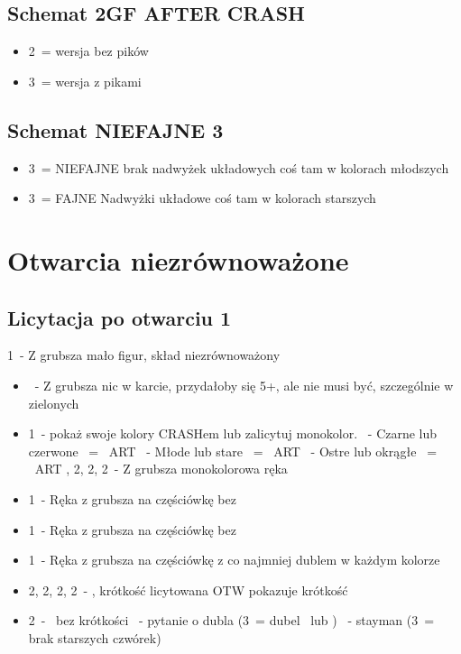 \documentclass[12pt, a4paper]{article}
\begin{document}
\subsection{Schemat 2\spades GF AFTER CRASH}
\begin{itemize}
    \item 2\nt\ = wersja bez pików
    \item 3\clubs\ = wersja z pikami
\end{itemize}

\subsection{Schemat NIEFAJNE 3\diams}
\begin{itemize}
    \item 3\hearts\ = 
    \subitem NIEFAJNE
    \subitem brak nadwyżek układowych
    \subitem coś tam w kolorach młodszych
    \item 3\spades\ =
    \subitem FAJNE
    \subitem Nadwyżki układowe
    \subitem coś tam w kolorach starszych
\end{itemize}


\pagebreak
\section{Otwarcia niezrównoważone}
\subsection{Licytacja po otwarciu 1\clubs}
\begin{formal}
    1\clubs\ - Z grubsza mało figur, skład niezrównoważony
\end{formal}
\begin{itemize}
    \item \pass\ - Z grubsza nic w karcie, przydałoby się 5+\clubs, ale nie musi być, szczególnie w zielonych
    \item 1\diams\ - pokaż swoje kolory CRASHem lub zalicytuj monokolor. \fonce
    \hearts\ - Czarne lub czerwone \spades\ = \gf\ ART
    \spades\ - Młode lub stare \spades\ = \gf\ ART
    \nt\ - Ostre lub okrągłe \spades\ = \gf\ ART
    \clubs, 2\diams, 2\hearts, 2\spades\ - Z grubsza monokolorowa ręka
    \item 1\hearts\ - Ręka z grubsza na częściówkę bez \hearts \then \soff
    \item 1\spades\ - Ręka z grubsza na częściówkę bez \spades \then \soff
    \item 1\nt\ - Ręka z grubsza na częściówkę z co najmniej dublem w każdym kolorze \then \soff
    \item 2\clubs, 2\diams, 2\hearts, 2\spades\ - \gf, krótkość licytowana \then OTW pokazuje krótkość
    \item 2\nt\ - \gf\ bez krótkości
    \clubs\ - pytanie o dubla (3\diams\ = dubel \clubs\ lub \diams)
    \diams\ - stayman (3\nt\ = brak starszych czwórek)
\end{itemize}
\end{document}
